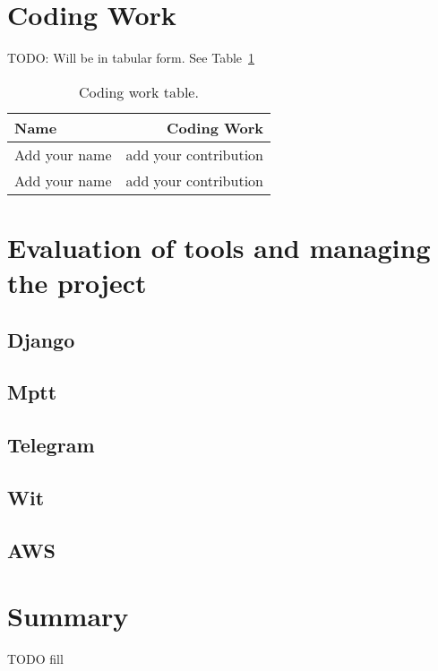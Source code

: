 \documentclass[a4paper]{article}
\begin{document}
\section{Coding Work}
TODO: Will be in tabular form. See Table~\ref{tab:codingwork}

\begin{table}
\centering
\begin{tabular}{l|r}
Name & Coding Work \\\hline
Add your name & add your contribution \\
Add your name & add your contribution
\end{tabular}
\caption{\label{tab:codingwork}Coding work table.}
\end{table}

\section{Evaluation of tools and managing the project}
\subsection{Django}
\subsection{Mptt}
\subsection{Telegram}
\subsection{Wit}
\subsection{AWS}

\section{Summary}
TODO fill
\end{document}
